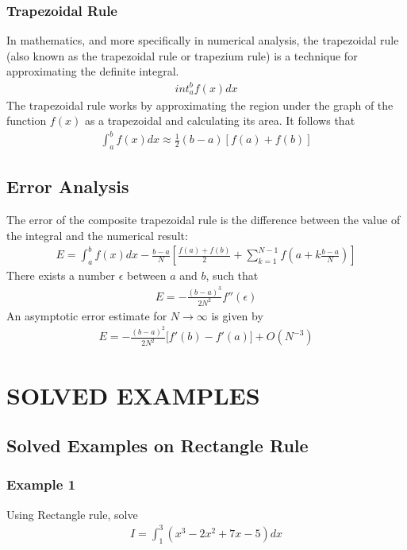 \documentclass[12pt]{report}
\begin{document}
	\subsection{Trapezoidal Rule}
	In mathematics, and more specifically in numerical analysis, the trapezoidal rule (also known as the trapezoidal rule or trapezium rule) is a technique for approximating the definite integral.
	\begin{eqnarray*}
		int_a^b f(x) dx
	\end{eqnarray*}
	The trapezoidal rule works by approximating the region under the graph of the function $f(x)$ as a trapezoidal and calculating its area. It follows that
	\begin{eqnarray*}
		\int_a^b f(x) dx \approx \frac{1}{2}(b-a)\left[f(a)+f(b)\right]
	\end{eqnarray*}

	\section{Error Analysis}
	The error of the composite trapezoidal rule is the difference between the value of the integral and the numerical result:
	\begin{eqnarray*}
		E = \int_a^b f(x) dx  - \frac{b-a}{N}\left[\frac{f(a) + f(b)}{2} + \sum_{k=1}^{N-1} f\left(a + k\frac{b-a}{N}\right) \right] 
	\end{eqnarray*}
	There exists a number $\epsilon$ between $a$ and $b$, such that
	\begin{eqnarray*}
		E = - \frac{(b-a)^3}{2N^2}f''(\epsilon)
	\end{eqnarray*}
	An asymptotic error estimate for $N\to\infty$ is given by 
	\begin{eqnarray*}
		E = - \frac{(b-a)^2}{2N^2}\bigg[ f'(b) - f'(a)\bigg] + O(N^{-3})
	\end{eqnarray*}
	
	\chapter{SOLVED EXAMPLES}
	\section{Solved Examples on Rectangle Rule}
	\subsection{Example 1}
	Using Rectangle rule, solve
	\begin{gather*}
		I = \int_1^3\left(x^3 - 2x^2 + 7x - 5\right)dx
	\end{gather*}
\end{document}
